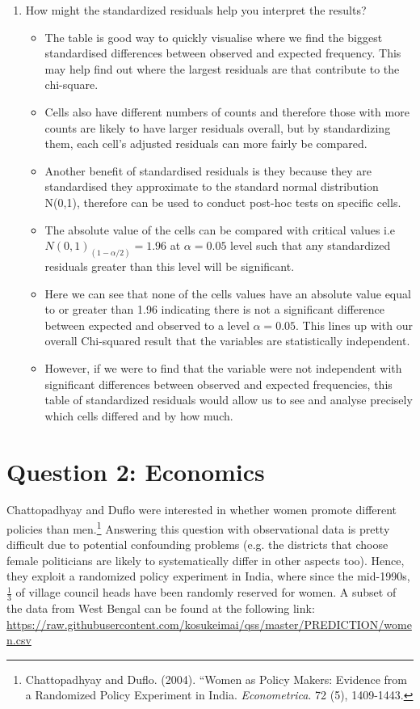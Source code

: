\documentclass[12pt,letterpaper]{article}
\begin{document}
\begin{enumerate}
	\newpage
	\item [(d)] How might the standardized residuals help you interpret the results?  \\
	\begin{itemize}
		\item 	The table is good way to quickly visualise where we find the biggest standardised differences between observed and expected frequency. This may help find out where the largest residuals are that contribute to the chi-square.
		\item Cells also have different numbers of counts and therefore those with more counts are likely to have larger residuals overall, but by standardizing them, each cell's adjusted residuals can more fairly be compared.
		\item Another benefit of standardised residuals is they because they are standardised they approximate to the standard normal distribution N(0,1), therefore can be used to conduct post-hoc tests on specific cells. 
		\item The absolute value of the cells can be compared with critical values i.e $N(0,1)_(1-\alpha/2) = 1.96 $ at $\alpha = 0.05$ level such that any standardized residuals greater than this level will be significant.
		\item Here we can see that none of the cells values have an absolute value equal to or greater than 1.96 indicating there is not a significant difference between expected and observed to a level $\alpha = 0.05$. This lines up with our overall Chi-squared result that the variables are statistically independent. 
		\item However, if we were to find that the variable were not independent with significant differences between observed and expected frequencies, this table of standardized residuals would allow us to see and analyse precisely which cells differed and by how much.   
	\end{itemize}
 
	
	
\end{enumerate}
\newpage

\section*{Question 2: Economics}
Chattopadhyay and Duflo were interested in whether women promote different policies than men.\footnote{Chattopadhyay and Duflo. (2004). ``Women as Policy Makers: Evidence from a Randomized Policy Experiment in India. \textit{Econometrica}. 72 (5), 1409-1443.} Answering this question with observational data is pretty difficult due to potential confounding problems (e.g. the districts that choose female politicians are likely to systematically differ in other aspects too). Hence, they exploit a randomized policy experiment in India, where since the mid-1990s, $\frac{1}{3}$ of village council heads have been randomly reserved for women. A subset of the data from West Bengal can be found at the following link: \url{https://raw.githubusercontent.com/kosukeimai/qss/master/PREDICTION/women.csv}\\
\end{document}

